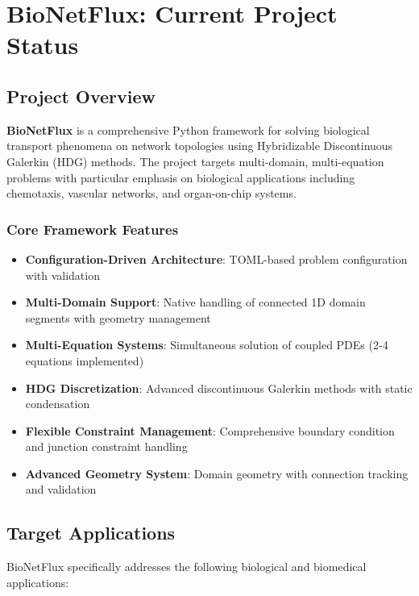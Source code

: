 %

\section{BioNetFlux: Current Project Status}

\subsection{Project Overview}

\textbf{BioNetFlux} is a comprehensive Python framework for solving biological transport phenomena on network topologies using Hybridizable Discontinuous Galerkin (HDG) methods. The project targets multi-domain, multi-equation problems with particular emphasis on biological applications including chemotaxis, vascular networks, and organ-on-chip systems.

\subsubsection{Core Framework Features}
\begin{itemize}
    \item \textbf{Configuration-Driven Architecture}: TOML-based problem configuration with validation
    \item \textbf{Multi-Domain Support}: Native handling of connected 1D domain segments with geometry management
    \item \textbf{Multi-Equation Systems}: Simultaneous solution of coupled PDEs (2-4 equations implemented)
    \item \textbf{HDG Discretization}: Advanced discontinuous Galerkin methods with static condensation
    \item \textbf{Flexible Constraint Management}: Comprehensive boundary condition and junction constraint handling
    \item \textbf{Advanced Geometry System}: Domain geometry with connection tracking and validation
\end{itemize}

\subsection{Target Applications}

BioNetFlux specifically addresses the following biological and biomedical applications:

